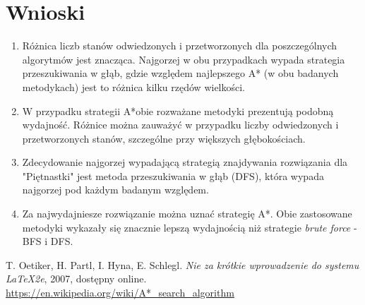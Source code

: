 \documentclass{classrep}
\begin{document}
\newpage
\section{Wnioski}
\begin{enumerate}
\item Różnica liczb stanów odwiedzonych i przetworzonych dla poszczególnych algorytmów jest znacząca. Najgorzej w obu przypadkach wypada strategia przeszukiwania w głąb, gdzie względem najlepszego A* (w obu badanych metodykach) jest to różnica kilku rzędów wielkości.
\item W przypadku strategii A*obie rozważane metodyki prezentują podobną wydajność. Różnice można zauważyć w przypadku liczby odwiedzonych i przetworzonych stanów, szczególne przy większych głębokościach.
\item Zdecydowanie najgorzej wypadającą strategią znajdywania rozwiązania dla "Piętnastki" jest metoda przeszukiwania w głąb (DFS), która wypada najgorzej pod każdym badanym względem.
\item Za najwydajniesze rozwiązanie można uznać strategię A*. Obie zastosowane metodyki wykazały się znacznie lepszą wydajnością niż strategie \textit{brute force} - BFS i DFS.
\end{enumerate}

\begin{thebibliography}{0}
   T. Oetiker, H. Partl, I. Hyna, E. Schlegl.
    \textsl{Nie za krótkie wprowadzenie do systemu \LaTeX2e}, 2007, dostępny
    online.
   \url{https://en.wikipedia.org/wiki/A*_search_algorithm}
  
\end{thebibliography}
\end{document}
